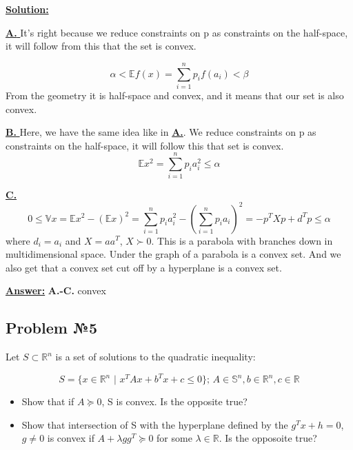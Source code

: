 \underline{\textbf{Solution:}}

\underline{\textbf{A. }} It's right because we reduce constraints on p as constraints on the half-space, it will follow from this that the set is convex.

\begin{equation*}
    \alpha < \mathds{E} f(x) = \sum\limits_{i=1}^n p_if(a_i) < \beta
\end{equation*}
From the geometry it is half-space and convex, and it means that our set is also convex.


\underline{\textbf{B. }}
Here, we have the same idea like in \underline{\textbf{A.}}. We reduce constraints on p as constraints on the half-space, it will follow this that set is convex.
\begin{equation*}
\mathds{E} x^2 = \sum\limits_{i = 1}^n p_i a_i^2 \leq \alpha
\end{equation*}

\underline{\textbf{C.}}
\begin{equation*}
    0 \leq \mathds{V}x = \mathds{E}x^2 - (\mathds{E} x)^2 = \sum\limits_{i = 1}^n p_i a_i^2 - \left( \sum\limits_{i = 1}^n p_ia_i \right)^2 = -p^TXp + d^Tp \leq \alpha
\end{equation*}
where $d_i = a_i$ and $X = aa^T$, $X \succ 0$. This is a parabola with branches down in multidimensional space. Under the graph of a parabola is a convex set. And we also get that a convex set cut off by a hyperplane is a convex set.

\underline{\textbf{Answer:}}
\textbf{A.-C.} convex

\subsection{Problem №5}
Let $S \subset \mathds{R}^n$ is a set of solutions to the quadratic inequality:

\begin{equation*}
    S = \{x \in \mathds{R}^n \text{ | } x^TAx + b^Tx + c \leq 0 \}\text{; } A \in \mathds{S}^n, b \in \mathds{R}^n, c \in \mathds{R}
\end{equation*}
\begin{itemize}
    \item Show that if $A \succcurlyeq 0$, S is convex. Is the opposite true?
    \item Show that intersection of S with the hyperplane defined by the $g^Tx + h = 0$, $g \not = 0$ is convex if $A + \lambda gg^T \succcurlyeq 0$ for some $\lambda \in \mathds{R}$. Is the opposoite true?
\end{itemize}

